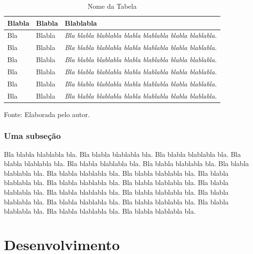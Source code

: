 \documentclass[tese,capa]{texufpel}
\begin{document}
\begin{table}
  \begin{center}
    \caption{Nome da Tabela}\label{tabela}
    \begin{tabular}{p{4cm}p{5cm}p{6cm}}
      \hline
      Blabla & Blabla & Blablabla\\
      \hline
      {\small Bla} & {\small Blabla} & {\small\em Bla blabla blablabla blabla
        blablabla blabla blablabla.}\\
      {\small Bla} & {\small Blabla} & {\small\em Bla blabla blablabla blabla
        blablabla blabla blablabla.}\\
      {\small Bla} & {\small Blabla} & {\small\em Bla blabla blablabla blabla
        blablabla blabla blablabla.}\\
      {\small Bla} & {\small Blabla} & {\small\em Bla blabla blablabla blabla
        blablabla blabla blablabla.}\\
      {\small Bla} & {\small Blabla} & {\small\em Bla blabla blablabla blabla
        blablabla blabla blablabla.}\\
      {\small Bla} & {\small Blabla} & {\small\em Bla blabla blablabla blabla
        blablabla blabla blablabla.}\\
      \hline
    \end{tabular}
    \begin{flushleft}
{\small Fonte: Elaborada pelo autor.}    
\end{flushleft}
  \end{center}
\end{table}

\subsection{Uma subseção}

Bla blabla blablabla bla.  Bla blabla blablabla bla.  Bla blabla
blablabla bla.  Bla blabla blablabla bla.  Bla blabla blablabla bla.
Bla blabla blablabla bla.  Bla blabla blablabla bla.  Bla blabla
blablabla bla.  Bla blabla blablabla bla.  Bla blabla blablabla bla.
Bla blabla blablabla bla.  Bla blabla blablabla bla.  Bla blabla
blablabla bla.  Bla blabla blablabla bla.  Bla blabla blablabla bla.
Bla blabla blablabla bla.  Bla blabla blablabla bla.  Bla blabla
blablabla bla.  Bla blabla blablabla bla.  Bla blabla blablabla bla.
Bla blabla blablabla bla.

\chapter{Desenvolvimento}
\end{document}
